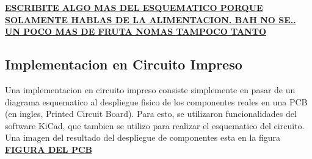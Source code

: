 \textbf{\underline{ESCRIBITE ALGO MAS DEL ESQUEMATICO PORQUE SOLAMENTE HABLAS DE LA ALIMENTACION. BAH NO SE.. UN POCO MAS DE FRUTA NOMAS TAMPOCO TANTO}}




\subsection{Implementacion en Circuito Impreso} %
\label{sub:implementacion_en_circuito_impreso}

Una implementacion en circuito impreso consiste simplemente en pasar de un diagrama esquematico al despliegue fisico de los componentes reales en una PCB (en ingles, Printed Circuit Board). Para esto, se utilizaron funcionalidades del software KiCad, que tambien se utilizo para realizar el esquematico del circuito. Una imagen del resultado del despliegue de componentes esta en la figura \textbf{\underline{FIGURA DEL PCB}}





